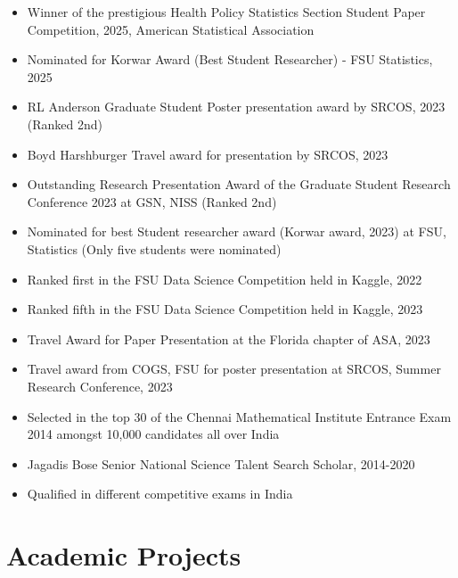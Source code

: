 \documentclass[11pt,a4paper]{article}
\begin{document}
\begin{itemize}[leftmargin=*]
  \item Winner of the prestigious Health Policy Statistics Section Student Paper Competition, 2025, American Statistical Association
  \item Nominated for Korwar Award (Best Student Researcher) - FSU Statistics, 2025
  \item RL Anderson Graduate Student Poster presentation award by SRCOS, 2023 (Ranked 2nd)
  \item Boyd Harshburger Travel award for presentation by SRCOS, 2023
  \item Outstanding Research Presentation Award of the Graduate Student Research Conference 2023 at GSN, NISS (Ranked 2nd)
  \item Nominated for best Student researcher award (Korwar award, 2023) at FSU, Statistics (Only five students were nominated)
  \item Ranked first in the FSU Data Science Competition held in Kaggle, 2022
  \item Ranked fifth in the FSU Data Science Competition held in Kaggle, 2023
  \item Travel Award for Paper Presentation at the Florida chapter of ASA, 2023
  \item Travel award from COGS, FSU for poster presentation at SRCOS, Summer Research Conference, 2023
  \item Selected in the top 30 of the Chennai Mathematical Institute Entrance Exam 2014 amongst 10,000 candidates all over India
  \item Jagadis Bose Senior National Science Talent Search Scholar, 2014-2020
  \item Qualified in different competitive exams in India
\end{itemize}

\section{Academic Projects}
\end{document}
